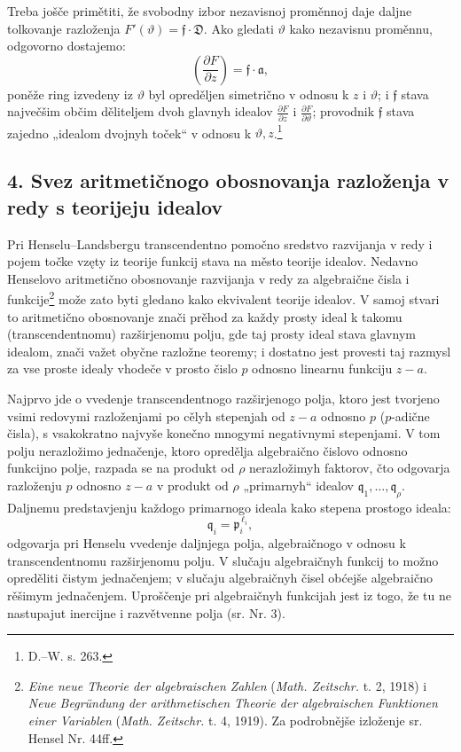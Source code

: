 \documentclass[11pt]{article}
\providecommand{\p}{\partial}
\providecommand{\frD}{\mathfrak D}
\providecommand{\frf}{\mathfrak f}
\providecommand{\fra}{\mathfrak a}
\providecommand{\frp}{\mathfrak p}
\begin{document}
Treba jošče primětiti, že svobodny izbor nezavisnoj proměnnoj daje daljne tolkovanje razloženja \(F'(\vartheta)=\frf\cdot\frD\). Ako gledati \(\vartheta\) kako nezavisnu proměnnu, odgovorno dostajemo:
\[
\left(\frac{\p F}{\p z}\right)=\frf\cdot\fra,
\]
poněže ring izvedeny iz \(\vartheta\) byl opreděljen simetrično v odnosu k \(z\) i \(\vartheta\); i \(\frf\) stava največšim občim děliteljem dvoh glavnyh idealov \(\frac{\p F}{\p z}\) i \(\frac{\p F}{\p\vartheta}\); provodnik \(\frf\) stava zajedno „idealom dvojnyh toček“ v odnosu k \(\vartheta,z\).\footnote{D.--W. s. 263.}

\subsection*{4. Svez aritmetičnogo obosnovanja razloženja v redy s teorijeju idealov}
Pri Henselu--Landsbergu transcendentno pomočno sredstvo razvijanja v redy i pojem točke vzęty iz teorije funkcij stava na město teorije idealov. Nedavno Henselovo aritmetično obosnovanje razvijanja v redy za algebraične čisla i funkcije\footnote{\emph{Eine neue Theorie der algebraischen Zahlen} (\emph{Math. Zeitschr.} t. 2, 1918) i \emph{Neue Begründung der arithmetischen Theorie der algebraischen Funktionen einer Variablen} (\emph{Math. Zeitschr.} t. 4, 1919). Za podrobnějše izloženje sr. Hensel Nr. 44ff.} može zato byti gledano kako ekvivalent teorije idealov. V samoj stvari to aritmetično obosnovanje znači prěhod za každy prosty ideal k takomu (transcendentnomu) razširjenomu polju, gde taj prosty ideal stava glavnym idealom, znači važet obyčne razložne teoremy; i dostatno jest provesti taj razmysl za vse proste idealy vhodeče v prosto čislo \(p\) odnosno linearnu funkciju \(z-a\).

Najprvo jde o vvedenje transcendentnogo razširjenogo polja, ktoro jest tvorjeno vsimi redovymi razloženjami po cělyh stepenjah od \(z-a\) odnosno \(p\) (\(p\)-adične čisla), s vsakokratno najvyše konečno mnogymi negativnymi stepenjami. V tom polju nerazložimo jednačenje, ktoro opredělja algebraično čislovo odnosno funkcijno polje, razpada se na produkt od \(\rho\) nerazložimyh faktorov, čto odgovarja razloženju \(p\) odnosno \(z-a\) v produkt od \(\rho\) „primarnyh“ idealov \(\mathfrak q_1,\ldots,\mathfrak q_\rho\). Daljnemu predstavjenju každogo primarnogo ideala kako stepena prostogo ideala:
\[
\mathfrak q_i=\frp_i^{\,\ell_i},
\]
odgovarja pri Henselu vvedenje daljnjega polja, algebraičnogo v odnosu k transcendentnomu razširjenomu polju. V slučaju algebraičnyh funkcij to možno opreděliti čistym jednačenjem; v slučaju algebraičnyh čisel obćejše algebraično rěšimym jednačenjem. Uproščenje pri algebraičnyh funkcijah jest iz togo, že tu ne nastupajut inercijne i razvětvenne polja (sr. Nr. 3).
\end{document}
